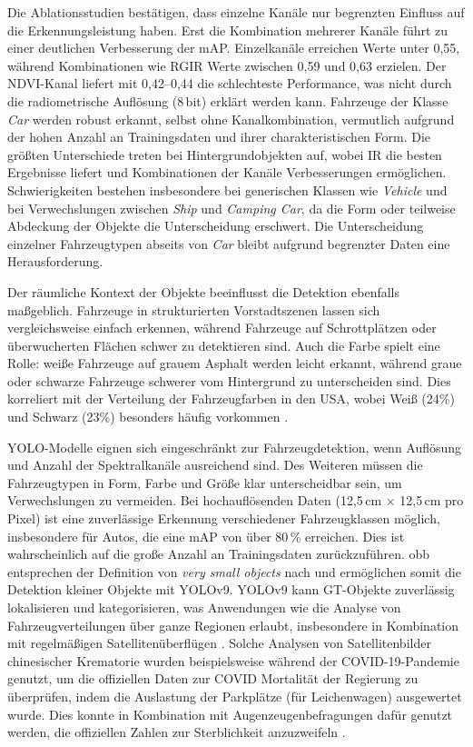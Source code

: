 Die Ablationsstudien bestätigen, dass einzelne Kanäle nur begrenzten Einfluss auf die Erkennungsleistung haben. Erst die Kombination mehrerer Kanäle führt zu einer deutlichen Verbesserung der mAP. Einzelkanäle erreichen Werte unter 0,55, während Kombinationen wie RGIR Werte zwischen 0,59 und 0,63 erzielen. Der NDVI-Kanal liefert mit 0,42–0,44 die schlechteste Performance, was nicht durch die radiometrische Auflösung (8\,bit) erklärt werden kann. Fahrzeuge der Klasse \emph{Car} werden robust erkannt, selbst ohne Kanalkombination, vermutlich aufgrund der hohen Anzahl an Trainingsdaten und ihrer charakteristischen Form. Die größten Unterschiede treten bei Hintergrundobjekten auf, wobei IR die besten Ergebnisse liefert und Kombinationen der Kanäle Verbesserungen ermöglichen. Schwierigkeiten bestehen insbesondere bei generischen Klassen wie \emph{Vehicle} und bei Verwechslungen zwischen \emph{Ship} und \emph{Camping Car}, da die Form oder teilweise Abdeckung der Objekte die Unterscheidung erschwert. Die Unterscheidung einzelner Fahrzeugtypen abseits von \emph{Car} bleibt aufgrund begrenzter Daten eine Herausforderung.

Der räumliche Kontext der Objekte beeinflusst die Detektion ebenfalls maßgeblich. Fahrzeuge in strukturierten Vorstadtszenen lassen sich vergleichsweise einfach erkennen, während Fahrzeuge auf Schrottplätzen oder überwucherten Flächen schwer zu detektieren sind. Auch die Farbe spielt eine Rolle: weiße Fahrzeuge auf grauem Asphalt werden leicht erkannt, während graue oder schwarze Fahrzeuge schwerer vom Hintergrund zu unterscheiden sind. Dies korreliert mit der Verteilung der Fahrzeugfarben in den USA, wobei Weiß (24\%) und Schwarz (23\%) besonders häufig vorkommen \cite{abc_utah}.

YOLO-Modelle eignen sich eingeschränkt zur Fahrzeugdetektion, wenn Auflösung und Anzahl der Spektralkanäle ausreichend sind. Des Weiteren müssen die Fahrzeugtypen in Form, Farbe und Größe klar unterscheidbar sein, um Verwechslungen zu vermeiden. Bei hochauflösenden Daten (12,5\,cm $\times$ 12,5\,cm pro Pixel) ist eine zuverlässige Erkennung verschiedener Fahrzeugklassen möglich, insbesondere für Autos, die eine mAP von über 80\,\% erreichen. Dies ist wahrscheinlich auf die große Anzahl an Trainingsdaten zurückzuführen. \acrshort{obb} entsprechen der Definition von \emph{very small objects} nach \citeauthor{Chen2017} \cite{Chen2017} und ermöglichen somit die Detektion kleiner Objekte mit \acrshort{YOLO}v9.  \acrshort{YOLO}v9 kann \Acrlong{GT}-Objekte zuverlässig lokalisieren und kategorisieren, was Anwendungen wie die Analyse von Fahrzeugverteilungen über ganze Regionen erlaubt, insbesondere in Kombination mit regelmäßigen Satellitenüberflügen \cite{planet_labs, airbus_neo}. Solche Analysen von Satellitenbilder chinesischer Krematorie wurden beispielsweise während der COVID-19-Pandemie genutzt, um die offiziellen Daten zur COVID Mortalität der Regierung zu überprüfen, indem die Auslastung der Parkplätze (für Leichenwagen) ausgewertet wurde. Dies konnte in Kombination mit Augenzeugenbefragungen dafür genutzt werden, die offiziellen Zahlen zur Sterblichkeit anzuzweifeln \cite{Spiegel_article}. 

